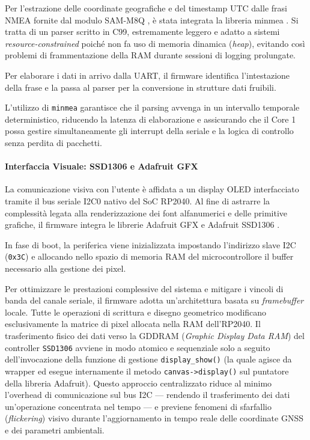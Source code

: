 Per l'estrazione delle coordinate geografiche e del timestamp UTC dalle frasi NMEA fornite dal modulo SAM-M8Q \cite{sam_m8q_ds}, è stata integrata la libreria minmea \cite{minmea_lib}. Si tratta di un parser scritto in C99, estremamente leggero e adatto a sistemi \textit{resource-constrained} poiché non fa uso di memoria dinamica (\textit{heap}), evitando così problemi di frammentazione della RAM durante sessioni di logging prolungate.

Per elaborare i dati in arrivo dalla UART, il firmware identifica l'intestazione della frase e la passa al parser per la conversione in strutture dati fruibili.

L'utilizzo di \texttt{minmea} garantisce che il parsing avvenga in un intervallo temporale deterministico, riducendo la latenza di elaborazione e assicurando che il Core 1 possa gestire simultaneamente gli interrupt della seriale e la logica di controllo senza perdita di pacchetti.

\paragraph{Interfaccia Visuale: SSD1306 e Adafruit GFX}

La comunicazione visiva con l'utente è affidata a un display OLED interfacciato tramite il bus seriale I2C0 nativo del SoC RP2040. Al fine di astrarre la complessità legata alla renderizzazione dei font alfanumerici e delle primitive grafiche, il firmware integra le librerie Adafruit GFX \cite{adafruit_gfx} e Adafruit SSD1306 \cite{adafruit_ssd1306}. 

In fase di boot, la periferica viene inizializzata impostando l'indirizzo slave I2C (\texttt{0x3C}) e allocando nello spazio di memoria RAM del microcontrollore il buffer necessario alla gestione dei pixel.

Per ottimizzare le prestazioni complessive del sistema e mitigare i vincoli di banda del canale seriale, il firmware adotta un'architettura basata su \textit{framebuffer} locale. Tutte le operazioni di scrittura e disegno geometrico modificano esclusivamente la matrice di pixel allocata nella RAM dell'RP2040. Il trasferimento fisico dei dati verso la GDDRAM (\textit{Graphic Display Data RAM}) del controller \texttt{SSD1306} avviene in modo atomico e sequenziale solo a seguito dell'invocazione della funzione di gestione \texttt{display\_show()} (la quale agisce da wrapper ed esegue internamente il metodo \texttt{canvas->display()} sul puntatore della libreria Adafruit). Questo approccio centralizzato riduce al minimo l'overhead di comunicazione sul bus I2C — rendendo il trasferimento dei dati un'operazione concentrata nel tempo — e previene fenomeni di sfarfallio (\textit{flickering}) visivo durante l'aggiornamento in tempo reale delle coordinate GNSS e dei parametri ambientali.

